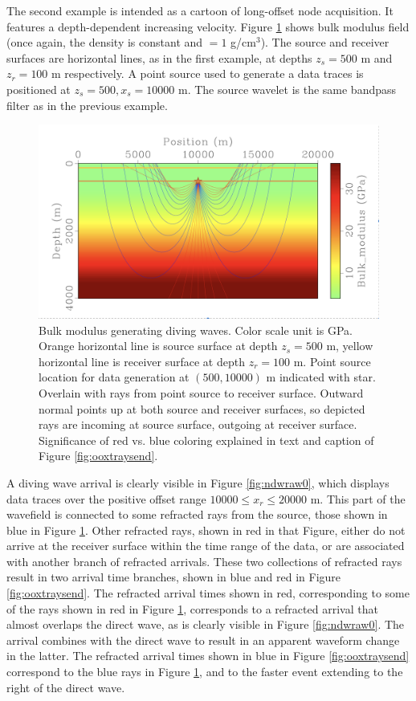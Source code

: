 \documentclass[12pt]{geophysics}
\begin{document}
The second example is intended as a cartoon of long-offset node
acquisition. It features a depth-dependent increasing
velocity. Figure \ref{fig:ooplrays0} shows bulk modulus field (once again, the
density is constant and $= 1$ g/cm$^3$). The source and receiver
surfaces are horizontal lines, as in the first example, at depths
$z_s=500$ m and $z_r= 100$ m respectively. A point source used to
generate a data traces is positioned at $z_s=500, x_s=10000$ m. The
source wavelet is the same bandpass filter as in
the previous example.

\begin{figure}
  \includegraphics[width=\textwidth]{ooplrays0.png}
  \caption{Bulk modulus generating diving waves. Color scale unit is
    GPa. Orange horizontal line is source surface at depth $z_s= 500$
    m, yellow horizontal
    line is receiver surface at depth $z_r=100$ m. Point source location for data
    generation at $(500, 10000)$ m indicated with star. Overlain with rays from point
    source to receiver surface. Outward normal points up at both source
    and receiver surfaces, so depicted rays are incoming at source
    surface, outgoing at receiver surface. Significance of red
    vs. blue coloring explained in text and caption of Figure \ref{fig:ooxtraysend}.}
  \label{fig:ooplrays0}
\end{figure}

A diving wave arrival is clearly visible in Figure
\ref{fig:ndwraw0}, which displays data traces over the positive offset range $10000 \le
x_r \le 20000$ m. This part of the wavefield is connected to some
refracted rays from the source, those shown in blue in Figure
\ref{fig:ooplrays0}.  Other refracted rays, shown in red in that
Figure, either do not arrive at the receiver surface within the time
range of the data, or are associated with another branch of refracted
arrivals. These two collections of refracted rays result in two
arrival time branches, shown in blue and red in Figure
\ref{fig:ooxtraysend}. The refracted arrival times shown in red,
corresponding to some of the rays shown in red in Figure
\ref{fig:ooplrays0}, corresponds to a refracted arrival that almost
overlaps the direct wave, as is clearly visible in Figure
\ref{fig:ndwraw0}. The arrival combines with the direct wave to result
in an apparent waveform change in the latter. The refracted arrival
times shown in blue in Figure \ref{fig:ooxtraysend} correspond to the
blue rays in Figure \ref{fig:ooplrays0}, and to the faster event
extending to the right of the direct wave.
\end{document}

